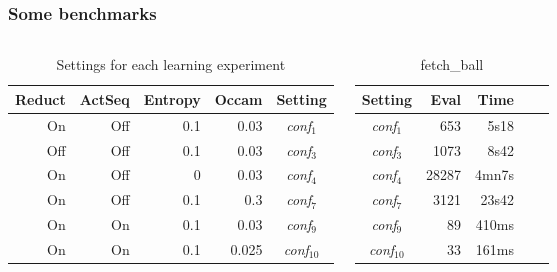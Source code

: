 \documentclass{beamer}
\begin{document}
\frame
{
  \frametitle{Some benchmarks}

{\tiny

\begin{columns}

\column{2in}

\begin{table}
\center
\begin{tabular}{|r|r|r|r||c|}
\hline
Reduct & ActSeq & Entropy & Occam & Setting \\
\hline
On & Off & 0.1   & 0.03 & {\it conf}$_1$ \\
Off & Off & 0.1  & 0.03 & {\it conf}$_3$ \\
On & Off & 0     & 0.03 & {\it conf}$_4$ \\
On & Off & 0.1   & 0.3 & {\it conf}$_7$ \\ 
On & On & 0.1  & 0.03 & {\it conf}$_9$ \\
On & On & 0.1 & 0.025 & {\it conf}$_{10}$ \\
\hline
\end{tabular}
\caption{Settings for each learning experiment}
\label{table:settings}
\end{table}


\column{1.5in}

\begin{table}
\center
\begin{tabular}{|c||r|r|r|r|}
\hline
Setting & Eval & Time \\
\hline
{\it conf}$_1$  & 653   & 5s18 \\
{\it conf}$_3$  & 1073  & 8s42 \\
{\it conf}$_4$  & 28287 & 4mn7s \\
{\it conf}$_7$  & 3121  & 23s42 \\
{\it conf}$_9$  & 89 & 410ms \\
{\it conf}$_{10}$  & 33 & 161ms \\
\hline
\end{tabular}
\caption{fetch\_ball}
\label{table:fetch}
\end{table}

\end{columns}

\begin{columns}

\column{1.5in}



\end{columns}}}
\end{document}
